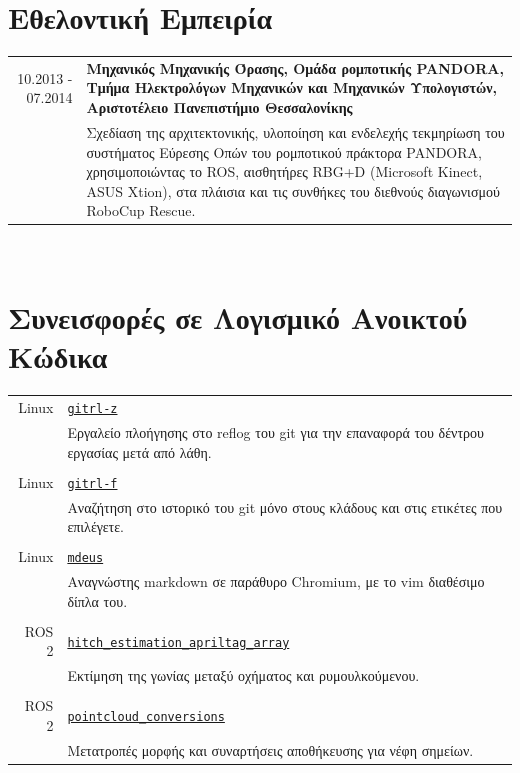 \documentclass[a4paper,10pt,twoside]{article}
\begin{document}
\section{Εθελοντική Εμπειρία}

\begin{tabular}{rp{12cm}}
10.2013 - 07.2014 & \textbf{Μηχανικός Μηχανικής Όρασης, Ομάδα ρομποτικής PANDORA,
                    Τμήμα Ηλεκτρολόγων Μηχανικών και Μηχανικών Υπολογιστών, Αριστοτέλειο Πανεπιστήμιο Θεσσαλονίκης} \\
                  & Σχεδίαση της αρχιτεκτονικής, υλοποίηση και ενδελεχής τεκμηρίωση
                    του συστήματος Εύρεσης Οπών του ρομποτικού πράκτορα PANDORA, χρησιμοποιώντας το ROS, αισθητήρες RBG+D
                    (Microsoft Kinect, ASUS Xtion), στα πλάισια και τις συνθήκες του διεθνούς διαγωνισμού RoboCup Rescue.\\
\end{tabular} \\


\section{Συνεισφορές σε Λογισμικό Ανοικτού Κώδικα}

\begin{tabular}{rp{12cm}}
Linux & \href{https://github.com/li9i/gitrl-z}{\texttt{gitrl-z}} \\
      & Εργαλείο πλοήγησης στο reflog του git για την επαναφορά του δέντρου εργασίας μετά από λάθη. \\
&\\
Linux & \href{https://github.com/gitrl-tools/gitrl-f}{\texttt{gitrl-f}} \\
      & Αναζήτηση στο ιστορικό του git μόνο στους κλάδους και στις ετικέτες που επιλέγετε. \\
&\\
Linux & \href{https://github.com/li9i/mdeus}{\texttt{mdeus}} \\
      & Αναγνώστης markdown σε παράθυρο Chromium, με το vim διαθέσιμο δίπλα του. \\
&\\
ROS 2 & \href{https://index.ros.org/p/hitch_estimation_apriltag_array/#humble}{\texttt{hitch\_estimation\_apriltag\_array}} \\
      & Εκτίμηση της γωνίας μεταξύ οχήματος και ρυμουλκούμενου. \\
&\\
ROS 2 & \href{https://index.ros.org/r/pointcloud_conversions/#lyrical}{\texttt{pointcloud\_conversions}} \\
      & Μετατροπές μορφής και συναρτήσεις αποθήκευσης για νέφη σημείων. \\
\end{tabular} \\
\vspace*{\fill}
\newpage
\end{document}
